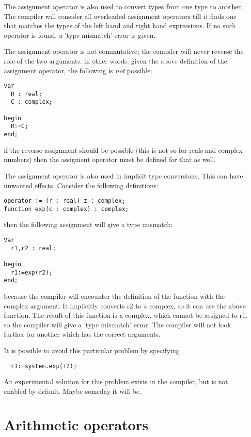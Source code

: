 \documentclass{report}
\begin{document}
The assignment operator is also used to convert types from one type to
another. The compiler will consider all overloaded assignment operators
till it finds one that matches the types of the left hand and right hand
expressions. If no such operator is found, a 'type mismatch' error
is given.

\begin{remark}
The assignment operator is not commutative; the compiler will never reverse
the role of the two arguments. in other words, given the above definition of
the assignment operator, the following is {\em not} possible:
\begin{verbatim}
var 
  R : real;
  C : complex;

begin
  R:=C;
end;
\end{verbatim}
if the reverse assignment should be possible (this is not so for reals and
complex numbers) then the assigment operator must be defined for that as well.
\end{remark}

\begin{remark}
The assignment operator is also used in implicit type conversions. This can
have unwanted effects. Consider the following definitions:
\begin{verbatim}
operator := (r : real) z : complex;
function exp(c : complex) : complex;
\end{verbatim}
then the following assignment will give a type mismatch:
\begin{verbatim}
Var 
  r1,r2 : real;

begin
  r1:=exp(r2);
end;
\end{verbatim}
because the compiler will encounter the definition of the  function 
with the complex argument. It implicitly converts r2 to a complex, so it can
use the above  function. The result of this function is a complex, 
which cannot be assigned to r1, so the compiler will give a 'type mismatch' 
error. The compiler will not look further for another  which has 
the correct arguments.

It is possible to avoid this particular problem by specifying
\begin{verbatim}
  r1:=system.exp(r2);
\end{verbatim}
An experimental solution for this problem exists in the compiler, but is
not enabled by default. Maybe someday it will be.
\end{remark}

\section{Arithmetic operators}
\end{document}

